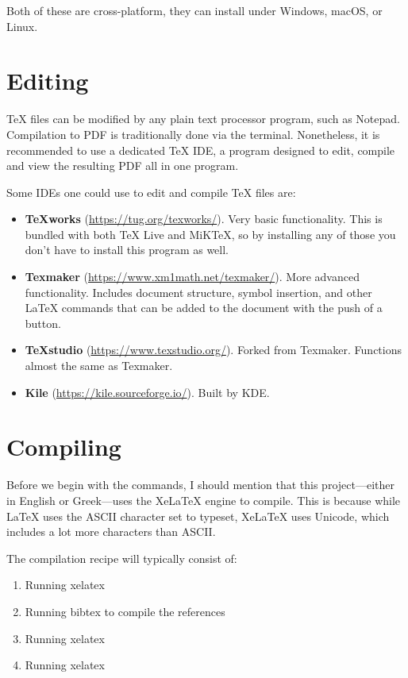 \documentclass[en,inscr,ack,preface]{dimscthesis}
\begin{document}
Both of these are cross-platform, they can install under Windows, macOS, or Linux.

\section{Editing} \label{editing}

\TeX{} files can be modified by any plain text processor program, such as Notepad.
Compilation to PDF is traditionally done via the terminal.
Nonetheless, it is recommended to use a dedicated \TeX{} IDE, a program designed to edit, compile and view the resulting PDF all in one program.

Some IDEs one could use to edit and compile \TeX{} files are:
\begin{itemize}
    \item \textbf{TeXworks} (\url{https://tug.org/texworks/}).
    Very basic functionality.
    This is bundled with both TeX Live and MiKTeX, so by installing any of those you don't have to install this program as well.
    \item \textbf{Texmaker} (\url{https://www.xm1math.net/texmaker/}).
    More advanced functionality.
    Includes document structure, symbol insertion, and other \LaTeX{} commands that can be added to the document with the push of a button.
    \item \textbf{TeXstudio} (\url{https://www.texstudio.org/}).
    Forked from Texmaker.
    Functions almost the same as Texmaker.
    \item \textbf{Kile} (\url{https://kile.sourceforge.io/}).
    Built by KDE.
\end{itemize}

\section{Compiling} \label{compiling}

Before we begin with the commands, I should mention that this project---either in English or Greek---uses the XeLaTeX engine to compile.
This is because while LaTeX uses the ASCII character set to typeset, XeLaTeX uses Unicode, which includes a lot more characters than ASCII.

The compilation recipe will typically consist of:
\begin{enumerate}
    \item Running xelatex
    \item Running bibtex to compile the references
    \item Running xelatex
    \item Running xelatex
\end{enumerate}
\end{document}
